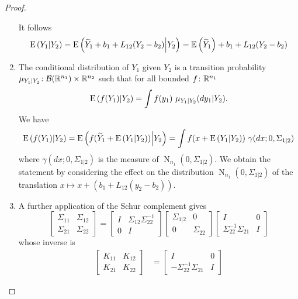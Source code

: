 \documentclass[12pt,a4paper]{amsart}
\newcommand{\gaussian}[3]{\operatorname{N}_{#1}\left(#2,#3\right)}
\theoremstyle{plain}%
\theoremstyle{definition}
\theoremstyle{remark}
\begin{document}
\begin{proof}
\begin{enumerate}
It follows
%
\begin{equation*}
  \operatorname{E}\left(Y_1 \middle| Y_2\right) = \operatorname{E}\left(\widetilde Y_1 + b_1 + L_{12}(Y_2-b_2) \middle| Y_2\right) = \operatorname{\mathbb E}\left(\widetilde Y_1\right) + b_1 + L_{12}(Y_2-b_2)
\end{equation*}
\item
The conditional distribution of $Y_1$ given $Y_2$ is a transition probability $\mu_{Y_1|Y_2} \colon \mathcal B(\mathbb{R}^{n_1}) \times \mathbb{R}^{n_2}$ such that for all bounded $f \colon \mathbb{R}^{n_1}$
%
\begin{equation*}
  \operatorname{E}\left(f(Y_1) \middle| Y_2\right) = \int f(y_1)\  \mu_{Y_1|Y_2}(dy_1|Y_2). 
\end{equation*}
%
We have
%
\begin{equation*}
  \condexp {f(Y_1)}{Y_2} = \condexp {f(\widetilde Y_1 + \condexp{Y_1}{Y_2})}{Y_2} = \int f( x + \condexp{Y_1}{Y_2}) \ \gamma(dx ; 0,\Sigma_{1|2})  
\end{equation*}
%
where $\gamma(dx;0,\Sigma_{1|2})$ is the measure of $\gaussian {n_1} {0} {\Sigma_{1|2}}$. We obtain the statement by considering the effect on the distribution $\gaussian {n_1} {0} {\Sigma_{1|2}}$ of the translation $x \mapsto x + (b_1 + L_{12}(y_2-b_2))$.
\item
%
A further application of the Schur complement gives
%
\begin{equation*}
  \begin{bmatrix}
      \Sigma_{11} & \Sigma_{12} \\ \Sigma_{21} & \Sigma_{22}
    \end{bmatrix}
= \begin{bmatrix}
    I & \Sigma_{12}\Sigma_{22}^{-1} \\ 0 & I
  \end{bmatrix}
  \begin{bmatrix}
    \Sigma_{1|2} & 0 \\ 0 & \Sigma_{22}
  \end{bmatrix}
  \begin{bmatrix}
    I & 0 \\ \Sigma_{22}^{-1} \Sigma_{21} & I
  \end{bmatrix}
\end{equation*}
%
whose inverse is 
%
\begin{align*}
  \begin{bmatrix}
      K_{11} & K_{12} \\ K_{21} & K_{22}
    \end{bmatrix}
&= 
\begin{bmatrix}
    I & 0 \\ - \Sigma_{22}^{-1} \Sigma_{21} & I

\end{bmatrix}
\end{align*}
\end{enumerate}
\end{proof}
\end{document}
